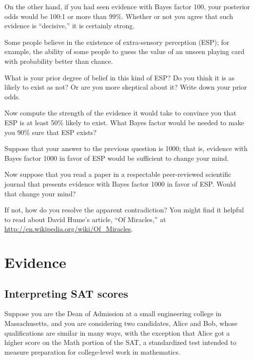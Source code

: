 \documentclass[12pt]{book}
\begin{document}
On the other hand, if you had seen evidence with Bayes
factor 100, your posterior odds would be 100:1 or more than 99\%.
Whether or not you agree that such evidence is ``decisive,''
it is certainly strong.

\begin{exercise}
Some people believe in the existence of extra-sensory
perception (ESP); for example, the ability of some people to guess
the value of an unseen playing card with probability better
than chance.

What is your prior degree of belief in this kind of ESP?
Do you think it is as likely to exist as not?  Or are you
more skeptical about it?  Write down your prior odds.

Now compute the strength of the evidence it would take to
convince you that ESP is at least 50\% likely to exist.
What Bayes factor would be needed to make you 90\% sure
that ESP exists?
\end{exercise}


\begin{exercise}
Suppose that your answer to the previous question is 1000;
that is, evidence with Bayes factor 1000 in favor of ESP would
be sufficient to change your mind.

Now suppose that you read a paper in a respectable peer-reviewed
scientific journal that presents evidence with Bayes factor 1000 in
favor of ESP.  Would that change your mind?

If not, how do you resolve the apparent contradiction?
You might find it helpful to read about David Hume's article, ``Of
Miracles,'' at \url{http://en.wikipedia.org/wiki/Of_Miracles}.

\end{exercise}



\chapter{Evidence}
\label{evidence}

\section{Interpreting SAT scores}

Suppose you are the Dean of Admission at a small engineering
college in Massachusetts, and you are considering two candidates,
Alice and Bob, whose qualifications are similar in many ways,
with the exception that Alice got a higher score on the Math
portion of the SAT, a standardized test intended to measure
preparation for college-level work in mathematics.
\end{document}
